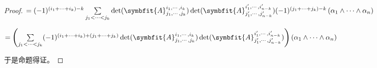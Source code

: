 \documentclass[12pt, a4paper, oneside, UTF8]{ctexbook}
\begin{document}
\begin{para}{0}
\begin{proof}
						$=(-1)^{(i_1+\cdots+i_k)-k}\sum\limits_{j_1 < \cdots < j_k}\det(\symbfit{A}_{j_1,\cdots,j_k}^{i_1,\cdots,i_k})\det(\symbfit{A}_{j_1',\cdots,j_{n-k}'}^{i_1',\cdots,i_{n-k}'})(-1)^{(j_1+\cdots+j_k)-k}\left(\alpha_{1} \wedge \cdots \wedge \alpha_{n}\right)$

						$=\left(\sum\limits_{j_1 < \cdots < j_k} (-1)^{(i_1+\cdots+i_k)+(j_1+\cdots+j_k)}\det(\symbfit{A}_{j_1,\cdots,j_k}^{i_1,\cdots,i_k})\det(\symbfit{A}_{j_1',\cdots,j_{n-k}'}^{i_1',\cdots,i_{n-k}'})\right)(\alpha_1 \wedge \cdots \wedge \alpha_n)$

						于是命题得证。
					\end{proof}
			\end{para}
\ifx\allfiles\undefined
\end{document}
